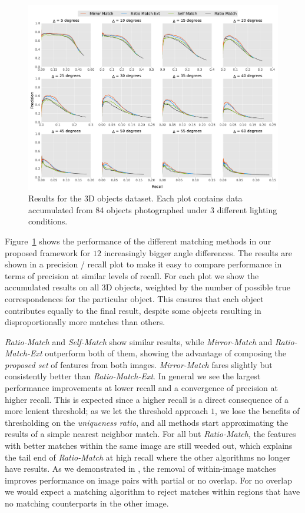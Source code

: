 \documentclass[review]{elsarticle}
\begin{document}
\begin{figure}[t]
	\centering
    \includegraphics[width=\columnwidth]{images/results_all_objects}
    \caption{Results for the 3D objects dataset. Each plot 
    contains data accumulated from 84 objects photographed under 3 
different lighting conditions.}
    \label{fig:all_objects}
\end{figure}

Figure~\ref{fig:all_objects} shows the performance of the different matching methods in our proposed framework for $12$ increasingly bigger angle differences. The results are shown in a precision / recall plot to make it easy to compare performance in terms of precision at similar levels of recall.  For each plot we show the accumulated results on all 3D objects, weighted by the number of possible true correspondences for the particular object. This ensures that each object contributes equally to the final result, despite some objects resulting in disproportionally more matches than others.

\emph{Ratio-Match} and \emph{Self-Match} show similar results, while \emph{Mirror-Match} and \emph{Ratio-Match-Ext} outperform both of them, showing the advantage of composing the \emph{proposed set} of features from both images. \emph{Mirror-Match} fares slightly but consistently better than \emph{Ratio-Match-Ext}. In general we see the largest performance improvements at lower recall and a  convergence of precision at higher recall. This is expected since a higher recall is a direct consequence of a more lenient threshold; as we let the threshold approach $1$, we lose the benefits of thresholding on the \emph{uniqueness ratio}, and all methods start approximating the results of a simple nearest neighbor match. For all but \emph{Ratio-Match}, the features with better matches within the same image are still weeded out, which explains the tail end of \emph{Ratio-Match} at high recall where the other algorithms no longer have results. As we demonstrated in \cite{arnfred2013mirror}, the removal of within-image matches improves performance on image pairs with partial or no overlap. For no overlap we would expect a matching algorithm to reject matches within regions that have no matching counterparts in the other image.
\end{document}
